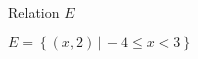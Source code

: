 {
\begin{center}
\\
Relation $E$
\end{center}}
{$E = \left\{ \left(x,2 \right) \, | \, -4 \leq x < 3 \right\}$}